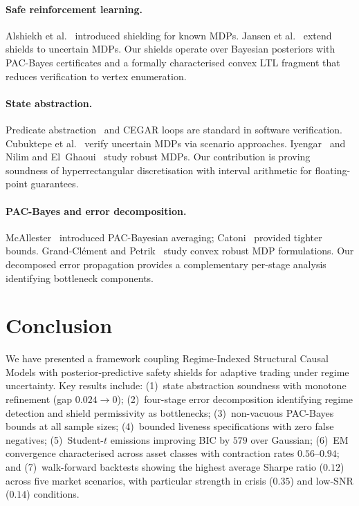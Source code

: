 \documentclass[11pt]{article}
\begin{document}
\paragraph{Safe reinforcement learning.}
Alshiekh et al.~\cite{alshiekh2018safe} introduced shielding for
known MDPs.  Jansen et al.~\cite{jansen2020safe} extend shields to
uncertain MDPs.  Our shields operate over Bayesian posteriors with
PAC-Bayes certificates and a formally characterised convex LTL
fragment that reduces verification to vertex enumeration.

\paragraph{State abstraction.}
Predicate abstraction~\cite{clarke2000counterexample} and CEGAR loops
are standard in software verification.
Cubuktepe et al.~\cite{cubuktepe2021scenario} verify uncertain MDPs
via scenario approaches.  Iyengar~\cite{iyengar2005robust} and
Nilim and El~Ghaoui~\cite{nilim2005robust} study robust MDPs.
Our contribution is proving soundness of hyperrectangular
discretisation with interval arithmetic for floating-point
guarantees.

\paragraph{PAC-Bayes and error decomposition.}
McAllester~\cite{mcallester1999pac} introduced PAC-Bayesian averaging;
Catoni~\cite{catoni2007pac} provided tighter bounds.
Grand-Cl\'ement and Petrik~\cite{grandclement2022convex} study convex
robust MDP formulations.  Our decomposed error propagation provides a
complementary per-stage analysis identifying bottleneck components.

\section{Conclusion}\label{sec:conclusion}

We have presented a framework coupling Regime-Indexed Structural
Causal Models with posterior-predictive safety shields for adaptive
trading under regime uncertainty.  Key results include: (1)~state
abstraction soundness with monotone refinement (gap
$0.024 \to 0$); (2)~four-stage error decomposition identifying regime
detection and shield permissivity as bottlenecks; (3)~non-vacuous
PAC-Bayes bounds at all sample sizes; (4)~bounded liveness
specifications with zero false negatives; (5)~Student-$t$ emissions
improving BIC by $579$ over Gaussian; (6)~EM convergence
characterised across asset classes with contraction rates
$0.56$--$0.94$; and (7)~walk-forward backtests showing the highest
average Sharpe ratio ($0.12$) across five market scenarios, with
particular strength in crisis ($0.35$) and low-SNR ($0.14$)
conditions.
\end{document}
